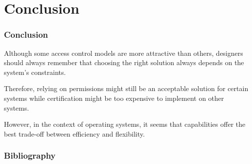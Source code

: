 %
%

\section{Conclusion}


\begin{frame}
  \frametitle{Conclusion}

  Although some access control models are more attractive than others,
  designers should always remember that choosing the right solution always
  depends on the system's constraints.

  \-

  Therefore, relying on  permissions might still be an acceptable
  solution for certain systems while certification might be too expensive
  to implement on other systems.

  \-

  However, in the context of operating systems, it seems that capabilities
  offer the best trade-off between efficiency and flexibility.
\end{frame}

%
%

\begin{frame}
  \frametitle{Bibliography}

  
  
\end{frame}


